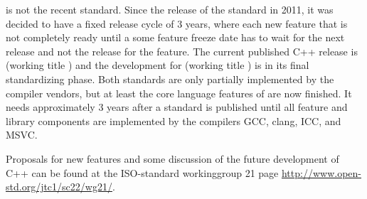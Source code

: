  is not the recent standard. Since the release of the  standard in 2011, it was decided to have a fixed release cycle of 3 years,
where each new feature that is not completely ready until a some feature freeze date has to wait for the next release and not the release for the feature.
The current published C++ release is  (working title ) and the development for  (working title ) is in its
final standardizing phase. Both standards are only partially implemented by the compiler vendors, but at least the core language features
of  are now finished. It needs approximately 3 years after a standard is published until all feature and library components are
implemented by the compilers GCC, clang, ICC, and MSVC.

Proposals for new features and some discussion of the future development of C++ can be found at the ISO-standard workinggroup 21 page
\url{http://www.open-std.org/jtc1/sc22/wg21/}.
